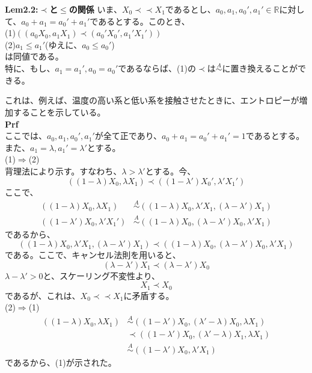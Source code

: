 \documentclass[a4paper,11pt]{jsarticle}
\begin{document}
\begin{itembox}[l]{\textbf{Lem2.2:$\prec$と$\leq$の関係}}
    いま、$X_0 \prec \prec X_1$であるとし、$a_0,a_1,a_0',a_1' \in \mathbb{R}$に対して、$a_0+a_1=a_0'+a_1'$であるとする。このとき、\\
    (1)$((a_0X_0,a_1X_1) \prec (a_0'X_0',a_1'X_1'))$\\
    (2)$ a_1 \leq a_1' $(ゆえに、$a_0 \leq a_0'$)\\
    は同値である。\\
    特に、もし、$a_1=a_1',a_0=a_0'$であるならば、(1)の$\prec$は$\overset{A}{\sim}$に置き換えることができる。
\end{itembox}
これは、例えば、温度の高い系と低い系を接触させたときに、エントロピーが増加することを示している。\\
\textbf{Prf}\\
ここでは、$a_0,a_1,a_0',a_1'$が全て正であり、$a_0+a_1=a_0'+a_1'=1$であるとする。また、$a_1=\lambda,a_1'=\lambda'$とする。\\
(1)$\Rightarrow$(2)\\
背理法により示す。すなわち、$\lambda > \lambda'$とする。今、
\begin{equation}
    ((1-\lambda)X_0,\lambda X_1) \prec ((1-\lambda')X_0',\lambda'X_1')
\end{equation}
ここで、
\begin{align}
    ((1-\lambda)X_0,\lambda X_1) &\overset{A}{\sim} ((1-\lambda)X_0,\lambda'X_1,(\lambda-\lambda')X_1)\\
    ((1-\lambda')X_0,\lambda'X_1') &\overset{A}{\sim} ((1-\lambda)X_0,(\lambda - \lambda')X_0,\lambda'X_1)
\end{align}
であるから、
\begin{equation}
    ((1-\lambda)X_0,\lambda'X_1,(\lambda-\lambda')X_1) \prec ((1-\lambda)X_0,(\lambda - \lambda')X_0,\lambda'X_1)
\end{equation}
である。ここで、キャンセル法則を用いると、
\begin{equation}
    (\lambda - \lambda')X_1 \prec (\lambda - \lambda')X_0
\end{equation}
$\lambda -\lambda '>0$と、スケーリング不変性より、
\begin{equation}
    X_1 \prec X_0
\end{equation}
であるが、これは、$X_0 \prec \prec X_1$に矛盾する。\\
(2)$\Rightarrow$(1)\\
\begin{align}
    ((1-\lambda)X_0,\lambda X_1) &\overset{A}{\sim} ((1-\lambda')X_0,(\lambda'-\lambda)X_0,\lambda X_1)\\
    &\prec ((1-\lambda')X_0,(\lambda'-\lambda)X_1,\lambda X_1)\\
    &\overset{A}{\sim} ((1-\lambda')X_0,\lambda'X_1)
\end{align}
であるから、(1)が示された。 \qedsymbol\\
\end{document}
